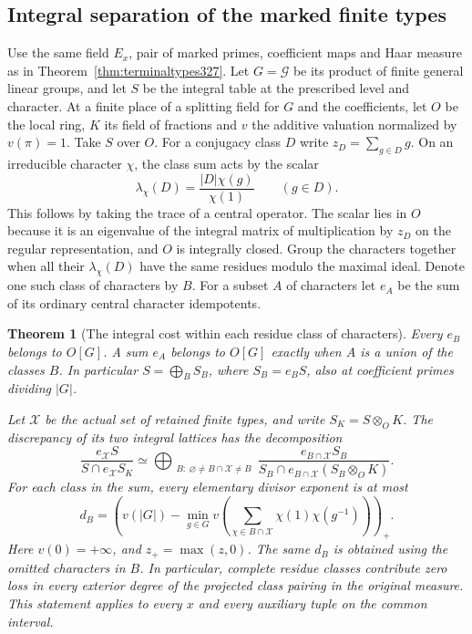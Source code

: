\documentclass[a4paper,11pt]{article}
\newtheorem{theorem}[proposition]{Theorem}
\theoremstyle{definition}
\theoremstyle{remark}
\numberwithin{equation}{section}
\begin{document}
\subsection{Integral separation of the marked finite types}\label{nav:typeblocks329}
Use the same field \(E_x\), pair of marked primes, coefficient maps and
Haar measure as in Theorem~\ref{thm:terminaltypes327}.
Let \(G=\mathcal G\) be its product of finite general linear groups,
and let \(S\) be the integral table at the prescribed level and
character. At a finite place of a splitting field for \(G\) and the
coefficients, let \(O\) be the local ring, \(K\) its field of fractions
and \(v\) the additive valuation normalized by \(v(\pi)=1\).
Take \(S\) over \(O\). For a conjugacy class \(D\) write
\(z_D=\sum_{g\in D}g\). On an irreducible character \(\chi\), the
class sum acts by the scalar
\[
 \lambda_\chi(D)=\frac{|D|\chi(g)}{\chi(1)}
 \qquad(g\in D).
\]
This follows by taking the trace of a central operator.
The scalar lies in \(O\) because it is an eigenvalue of the integral
matrix of multiplication by \(z_D\) on the regular representation,
and \(O\) is integrally closed. Group the characters together
when all their \(\lambda_\chi(D)\) have the same residues modulo
the maximal ideal. Denote one such class of characters by \(B\).
For a subset \(A\) of characters let \(e_A\) be the sum of its
ordinary central character idempotents.

\begin{theorem}[The integral cost within each residue class of characters]\leavevmode
\label{thm:typeblocks329}
Every \(e_B\) belongs to \(O[G]\). A sum \(e_A\) belongs to \(O[G]\)
exactly when \(A\) is a union of the classes \(B\).
In particular \(S=\bigoplus_B S_B\), where \(S_B=e_BS\),
also at coefficient primes dividing \(|G|\).

Let \(\mathcal X\) be the actual set of retained finite types, and
write \(S_K=S\otimes_O K\). The discrepancy of its two integral
lattices has the decomposition
\begin{equation}\label{eq:typeblocks329}
 \frac{e_{\mathcal X}S}{S\cap e_{\mathcal X}S_K}
 \simeq
 \bigoplus_{\substack{B:\ \varnothing\ne B\cap\mathcal X\ne B}}
 \frac{e_{B\cap\mathcal X}S_B}
      {S_B\cap e_{B\cap\mathcal X}(S_B\otimes_O K)} .
\end{equation}
For each class in the sum, every elementary divisor exponent is
at most
\[
 d_B=\left(v(|G|)-\min_{g\in G}
 v\!\left(\sum_{\chi\in B\cap\mathcal X}
                   \chi(1)\chi(g^{-1})\right)\right)_+.
\]
Here \(v(0)=+\infty\), and \(z_+=\max(z,0)\).
The same \(d_B\) is obtained using the omitted characters in \(B\).
In particular, complete residue classes contribute zero loss in
every exterior degree of the projected class pairing in the
original measure. This statement applies to every \(x\) and every
auxiliary tuple on the common interval.
\end{theorem}
\end{document}
